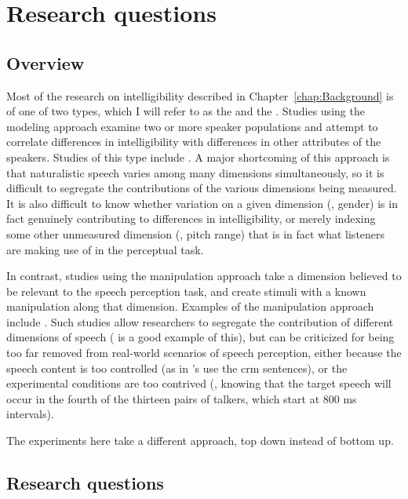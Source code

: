\chapter{Research questions\label{chap:Questions}}

\section{Overview}
Most of the research on intelligibility described in Chapter~\ref{chap:Background} is of one of two types, which I will refer to as the  and the .  Studies using the modeling approach examine two or more speaker populations and attempt to correlate differences in intelligibility with differences in other attributes of the speakers.  Studies of this type include \citet{BradlowEtAl1996, HazanMarkham2004, Neel2008, McCloyEtAl2013}.  A major shortcoming of this approach is that naturalistic speech varies among many dimensions simultaneously, so it is difficult to segregate the contributions of the various dimensions being measured.  It is also difficult to know whether variation on a given dimension (\eg, gender) is in fact genuinely contributing to differences in intelligibility, or merely indexing some other unmeasured dimension (\eg, pitch range) that is in fact what listeners are making use of in the perceptual task. 

In contrast, studies using the manipulation approach take a dimension believed to be relevant to the speech perception task, and create stimuli with a known manipulation along that dimension.  Examples of the manipulation approach include \citet{xxx}.  Such studies allow researchers to segregate the contribution of different dimensions of speech (\citet{KiddEtAl2005a} is a good example of this), but can be criticized for being too far removed from real-world scenarios of speech perception, either because the speech content is too controlled (as in \citeauthor{KiddEtAl2005a}’s use the \ac{crm} sentences), or the experimental conditions are too contrived (\eg, knowing that the target speech will occur in the fourth of the thirteen pairs of talkers, which start at 800 ms intervals).

The experiments here take a different approach, top down instead of bottom up.

\section{Research questions}


